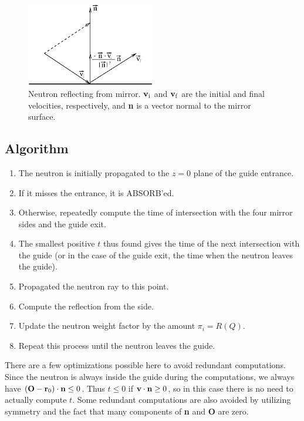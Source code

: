 \begin{figure}
  \begin{center}
    \includegraphics[width=0.5\textwidth]{figures/guide2.eps}
  \end{center}
\caption{Neutron reflecting from mirror. ${\bf v}_{\rm i}$ and
${\bf v}_{\rm f}$ are the initial and final velocities, respectively,
and {\bf n} is a vector normal to the mirror surface.}
\label{f:guidereflect}
\end{figure}

\subsection{Algorithm}
\begin{enumerate}
\item The neutron is initially propagated to the $z = 0$ plane of the
guide entrance.
\item If it misses the entrance, it is ABSORB'ed.
\item Otherwise, repeatedly compute the time of intersection with the
four mirror sides and the guide exit.
\item The smallest positive $t$ thus
found gives the time of the next intersection with the guide (or in the
case of the guide exit, the time when the neutron leaves the guide).
\item Propagated the neutron ray to this point.
\item Compute the reflection from the side.
\item Update the neutron weight factor by the amount $\pi_i = R(Q)$.
\item Repeat this process until the neutron leaves the guide.
\end{enumerate}

There are a few optimizations possible here to avoid redundant
computations. Since the neutron is always inside the guide during the
computations, we always have
$({\bf O} - {\bf r}_0) \cdot {\bf n} \leq 0$.
Thus $t \leq 0$ if ${\bf v} \cdot {\bf n} \geq 0$, so in this case
there is no need to actually compute $t$. Some redundant computations
are also avoided by utilizing symmetry and the fact that many
components of {\bf n} and {\bf O} are zero.

